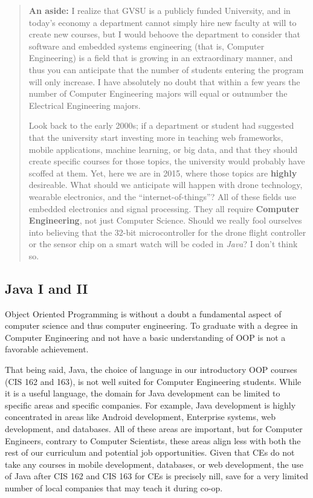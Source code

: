 \documentclass[12pt]{article}
\numberwithin{figure}{section}
\numberwithin{equation}{section}
\begin{document}
{\bigskip

\begin{quote}
\textbf{An aside:} I realize that GVSU is a publicly funded University, and in today's economy a department cannot simply hire new faculty at will to create new courses, but I would behoove the department to consider that software and embedded systems engineering (that is, Computer Engineering) is a field that is growing in an extraordinary manner, and thus you can anticipate that the number of students entering the program will only increase. I have absolutely no doubt that within a few years the number of Computer Engineering majors will equal or outnumber the Electrical Engineering majors.

\bigskip

Look back to the early 2000s; if a department or student had suggested that the university start investing more in teaching web frameworks, mobile applications, machine learning, or big data, and that they should create specific courses for those topics, the university would probably have scoffed at them. Yet, here we are in 2015, where those topics are \textbf{highly} desireable. What should we anticipate will happen with drone technology, wearable electronics, and the ``internet-of-things''? All of these fields use embedded electronics and signal processing. They all require \textbf{Computer Engineering}, not just Computer Science. Should we really fool ourselves into believing that the 32-bit microcontroller for the drone flight controller or the sensor chip on a smart watch will be coded in \emph{Java}? I don't think so.
\end{quote}

\subsection{Java I and II}\label{java}
Object Oriented Programming is without a doubt a fundamental aspect of
computer science and thus computer engineering. To graduate with a
degree in Computer Engineering and not have a basic understanding of OOP
is not a favorable achievement.

\bigskip

That being said, Java, the choice of language in our introductory OOP
courses (CIS 162 and 163), is not well suited for Computer Engineering
students. While it is a useful language, the domain for Java development
can be limited to specific areas and specific companies. For example,
Java development is highly concentrated in areas like Android
development, Enterprise systems, web development, and databases. All of
these areas are important, but for Computer Engineers, contrary to
Computer Scientists, these areas align less with both the rest of our
curriculum and potential job opportunities. Given that CEs do not take
any courses in mobile development, databases, or web development, the
use of Java after CIS 162 and CIS 163 for CEs is precisely nill, save
for a very limited number of local companies that may teach it during
co-op.

}
\end{document}
